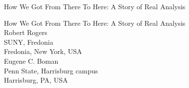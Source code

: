\documentclass[oneside,10pt,]{book}
\begin{document}
\raggedbottom
\frontmatter
\thispagestyle{empty}
{\titlepagefont\centering
\vspace*{0.28\textheight}
{\Huge How We Got From There To Here: A Story of Real Analysis}\\}
\clearpage
\thispagestyle{empty}
{\titlepagefont\centering
\vspace*{0.14\textheight}
{\Huge How We Got From There To Here: A Story of Real Analysis}\\[3\baselineskip]
{\Large Robert Rogers}\\[0.5\baselineskip]
{\Large SUNY, Fredonia\\
Fredonia, New York, USA}\\[3\baselineskip]
{\Large Eugene C. Boman}\\[0.5\baselineskip]
{\Large Penn State, Harrisburg campus\\
Harrisburg, PA, USA}\\}
\clearpage

%
%
\typeout{************************************************}
\typeout{************************************************}
%



\setcounter{tocdepth}{0}
\renewcommand*\contentsname{Sumário}
\tableofcontents
\mainmatter
%

















%
\backmatter%
%
\clearpage{}%
%
%
%



{\xreffont\printindex}
%
\end{document}
